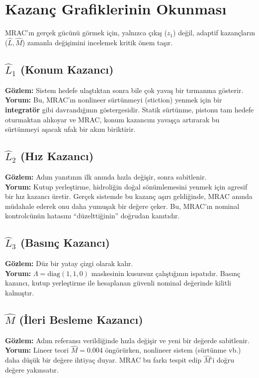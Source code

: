 \documentclass[12pt,a4paper]{article}
\begin{document}
\section{Kazanç Grafiklerinin Okunması}
\label{sec:gain_analysis}

MRAC'ın gerçek gücünü görmek için, yalnızca çıkış ($z_1$) değil, adaptif kazançların ($\hat{L}, \hat{M}$) zamanla değişimini incelemek kritik önem taşır.

\subsection{$\hat{L}_1$ (Konum Kazancı)}
\textbf{Gözlem:} Sistem hedefe ulaştıktan sonra bile çok yavaş bir tırmanma gösterir.\\
\textbf{Yorum:} Bu, MRAC'ın nonlineer sürtünmeyi (stiction) yenmek için bir \textbf{integratör} gibi davrandığının göstergesidir. Statik sürtünme, pistonu tam hedefe oturmaktan alıkoyar ve MRAC, konum kazancını yavaşça artırarak bu sürtünmeyi aşacak ufak bir akım biriktirir.

\subsection{$\hat{L}_2$ (Hız Kazancı)}
\textbf{Gözlem:} Adım yanıtının ilk anında hızla değişir, sonra sabitlenir.\\
\textbf{Yorum:} Kutup yerleştirme, hidroliğin doğal sönümlemesini yenmek için agresif bir hız kazancı üretir. Gerçek sistemde bu kazanç aşırı geldiğinde, MRAC anında müdahale ederek onu daha yumuşak bir değere çeker. Bu, MRAC'ın nominal kontrolcünün hatasını ``düzelttiğinin'' doğrudan kanıtıdır.

\subsection{$\hat{L}_3$ (Basınç Kazancı)}
\textbf{Gözlem:} Düz bir yatay çizgi olarak kalır.\\
\textbf{Yorum:} $\Lambda = \text{diag}(1,1,0)$ maskesinin kusursuz çalıştığının ispatıdır. Basınç kazancı, kutup yerleştirme ile hesaplanan güvenli nominal değerinde kilitli kalmıştır.

\subsection{$\hat{M}$ (İleri Besleme Kazancı)}
\textbf{Gözlem:} Adım referansı verildiğinde hızla değişir ve yeni bir değerde sabitlenir.\\
\textbf{Yorum:} Lineer teori $\hat{M} = 0.004$ öngörürken, nonlineer sistem (sürtünme vb.) daha düşük bir değere ihtiyaç duyar. MRAC bu farkı tespit edip $\hat{M}$'i doğru değere yakınsatır.
\end{document}

